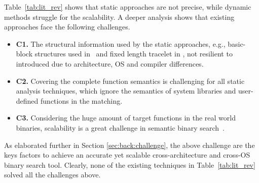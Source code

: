 Table~\ref{tab:lit_rev} shows that static approaches are not precise, while dynamic methods struggle for the scalability.
A deeper analysis shows that existing approaches face the following challenges.
\vspace{-2mm}
\begin{itemize}%
\itemsep0em
\item \textbf{C1.} The structural information used by the static approaches, e.g., basic-block structures used in~\cite{luo2014semantics,DBLP:conf/sp/PewnyGGRH15,sebastian2016discovre} and fixed length tracelet in \cite{DBLP:conf/pldi/DavidY14},  not resilient to
 introduced due to architecture, OS and compiler differences.
\item \textbf{C2.}  Covering the complete function semantics is challenging for all static analysis techniques, which ignore the semantics of system libraries and user-defined functions in the matching.
\item \textbf{C3.} Considering the huge amount of target functions in the real world binaries, scalability is a great challenge in semantic binary search~\cite{luo2014semantics,DBLP:conf/sp/PewnyGGRH15}.
\end{itemize}
\vspace{-2mm}

As elaborated further in Section \ref{sec:back:challenge}, the above challenge are the keys factors to achieve an accurate yet scalable cross-architecture and cross-OS binary search tool. Clearly, none of the existing techniques in Table~\ref{tab:lit_rev} solved all the challenges above.


